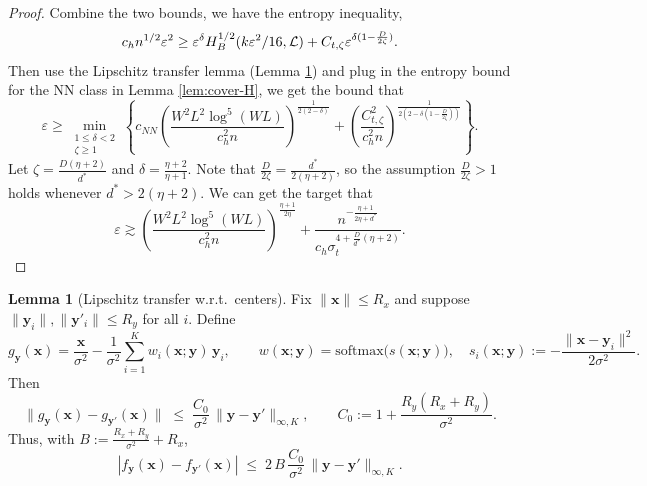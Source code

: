\documentclass[12pt]{article}
\theoremstyle{definition} %
\newtheorem{lemma}{Lemma}
\newcommand{\y}{\bm y}
\newcommand{\x}{\bm x}
\begin{document}
\begin{proof}
Combine the two bounds, we have the entropy inequality,
\begin{equation}
c_hn^{1/2}\varepsilon^2\geq \varepsilon^{\delta}H_B^{1/2}(k\varepsilon^2/16,{\cal L}) + C_{t,\zeta}\varepsilon^{\delta(1-\frac{D}{2\zeta})}.
\end{equation}
Then use the Lipschitz transfer lemma (Lemma \ref{lem:Lip-transfer}) and plug in the entropy bound for the NN class in Lemma \ref{lem:cover-H}, we get the bound that
\begin{equation}
\varepsilon\geq \min_{\substack{1\leq \delta< 2\\ \zeta\geq 1}}\left\{c_{NN}\left(\frac{W^2L^2\log^{5}(WL)}{c^2_hn}\right)^{\frac{1}{2(2-\delta)}} 
+\left( \frac{C^2_{t,\zeta}}{c_h^2n}\right)^{\frac{1}{2(2-\delta(1-\frac{D}{2\zeta}))}}
\right\}.
\end{equation}
Let $\zeta=\frac{D(\eta+2)}{d^*}$ and $\delta=\frac{\eta+2}{\eta+1}$. Note that $\frac{D}{2\zeta}=\frac{d^*}{2(\eta+2)}$, so the assumption $\frac{D}{2\zeta}>1$ holds whenever $d^*>2(\eta+2)$. We can get the target that
\begin{equation}
\varepsilon\gtrsim \left(\frac{W^2L^2\log^{5}(WL)}{c^2_hn}\right)^{\frac{\eta+1}{2\eta}} 
+\frac{n^{-\frac{\eta+1}{2\eta+d^*}}}{c_h\sigma_t^{4+\frac{D}{d^*}(\eta+2)}}.
\end{equation}
\end{proof}

\begin{lemma}[Lipschitz transfer w.r.t.\ centers]
\label{lem:Lip-transfer}
Fix $\|\x\|\le R_x$ and suppose $\|\y_i\|,\|\y'_i\|\le R_y$ for all $i$. Define
\[
g_{\y}(\x)=\frac{\x}{\sigma^2}-\frac{1}{\sigma^2}\sum_{i=1}^K w_i(\x;\y)\,\y_i,
\qquad
w(\x;\y)=\mathrm{softmax}\!\Big(s(\x;\y)\Big),
\quad
s_i(\x;\y):=-\frac{\|\x-\y_i\|^2}{2\sigma^2}.
\]
Then
\[
\|g_{\y}(\x)-g_{\y'}(\x)\|
\;\le\;
\frac{C_0}{\sigma^2}\,\|\y-\y'\|_{\infty,K},
\qquad
C_0:=1+\frac{R_y(R_x+R_y)}{\sigma^2}.
\]
Thus, with $B:=\frac{R_x+R_y}{\sigma^2}+R_x$,
\[
|f_{\y}(\x)-f_{\y'}(\x)|
\;\le\;
2\,B\,\frac{C_0}{\sigma^2}\,\|\y-\y'\|_{\infty,K}.
\]
\end{lemma}
\end{document}
